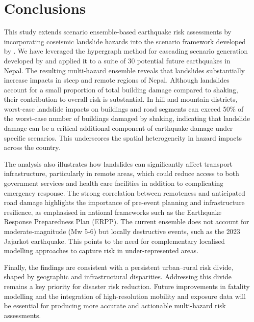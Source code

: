 \documentclass[preprint,12pt,authoryear]{elsarticle}
\begin{document}
\section{Conclusions}

This study extends scenario ensemble-based earthquake risk assessments by incorporating coseismic landslide hazards into the scenario framework developed by \cite{Robinson2018}. We have leveraged the hypergraph method for cascading scenario generation developed by \cite{Dunant2025} and applied it to a suite of 30 potential future earthquakes in Nepal. The resulting multi-hazard ensemble reveals that landslides substantially increase impacts in steep and remote regions of Nepal. Although landslides account for a small proportion of total building damage compared to shaking, their contribution to overall risk is substantial. In hill and mountain districts, worst-case landslide impacts on buildings and road segments can exceed 50\% of the worst-case number of buildings damaged by shaking, indicating that landslide damage can be a critical additional component of earthquake damage under specific scenarios. This underscores the spatial heterogeneity in hazard impacts across the country.

The analysis also illustrates how landslides can significantly affect transport infrastructure, particularly in remote areas, which could reduce access to both government services and health care facilities in addition to complicating emergency response. The strong correlation between remoteness and anticipated road damage highlights the importance of pre-event planning and infrastructure resilience, as emphasised in national frameworks such as the Earthquake Response Preparedness Plan (ERPP). The current ensemble does not account for moderate-magnitude (Mw 5-6) but locally destructive events, such as the 2023 Jajarkot earthquake. This points to the need for complementary localised modelling approaches to capture risk in under-represented areas.

Finally, the findings are consistent with a persistent urban--rural risk divide, shaped by geographic and infrastructural disparities. Addressing this divide remains a key priority for disaster risk reduction. Future improvements in fatality modelling and the integration of high-resolution mobility and exposure data will be essential for producing more accurate and actionable multi-hazard risk assessments.
\end{document}
